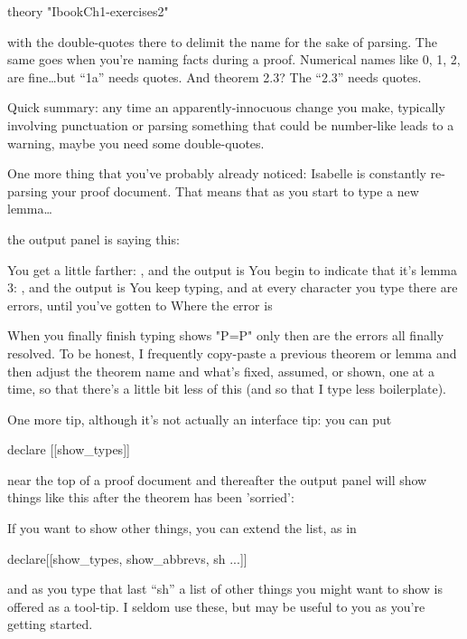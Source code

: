 theory "IbookCh1-exercises2"

with the double-quotes there to delimit the name for the sake of parsing. The same goes when you're naming facts during a proof. Numerical names like 0, 1, 2, are fine\ldots but ``1a'' needs quotes. And theorem 2.3? The ``2.3'' needs quotes. 

Quick summary: any time an apparently-innocuous change you make, typically involving punctuation or parsing something that could be number-like leads to a warning, maybe you need some double-quotes.

One more thing that you've probably already noticed: Isabelle is constantly re-parsing your proof document. That means that as you start to type a new lemma\ldots

the output panel is saying this:

You get a little farther: , and the output is 
You begin to indicate that it's lemma 3: , and the output is 
You keep typing, and at every character you type there are errors, until you've gotten to 
Where the error is 

When you finally finish typing 
shows "P=P"
only then are the errors all finally resolved. To be honest, I frequently copy-paste a previous theorem or lemma and then adjust the theorem name and what's fixed, assumed, or shown, one at a time, so that there's a little bit less of this (and so that I type less boilerplate). 

One more tip, although it's not actually an interface tip: you can put 
\begin{IS}
    declare [[show_types]]
\end{IS}
near the top of a proof document and thereafter the output panel will show things like this after the  theorem has been 'sorried':

If you want to show other things, you can extend the list, as in 
\begin{IS}
declare[[show_types, show_abbrevs, sh ...]]
\end{IS}
and as you type that last ``sh'' a list of other things you might want to show is offered as a tool-tip. I seldom use these, but  may be useful to you as you're getting started. 

